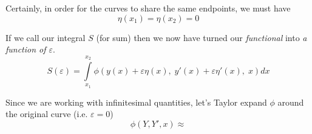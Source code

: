 \documentclass{article}
\begin{document}
Certainly, in order for the curves to share the same endpoints, we must have
\begin{equation}
  \eta(x_1) = \eta(x_2) = 0 
\end{equation}

If we call our integral $S$ (for sum) then we now have turned our
\textit{functional} into \textit{a function of $\varepsilon$}.
\begin{equation}
  S(\varepsilon) = \int\limits_{x_1}^{x_2}\phi\left(y(x)+\varepsilon\eta(x),\;
    y'(x)+\varepsilon\eta'(x),\; x  \right)dx
\end{equation}

Since we are working with infinitesimal quantities, let's Taylor expand $\phi$
around the original curve (i.e. $\varepsilon = 0 $)
\begin{equation}
  \phi(Y, Y', x) \approx 
\end{equation}
\end{document}
